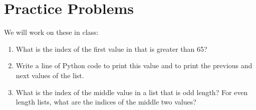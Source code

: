 \documentclass[letterpaper,10pt,english]{sphinxmanual}
\begin{document}
\section{Practice Problems}
\label{\detokenize{lecture_notes/lec08_lists1:practice-problems}}
We will work on these in class:
\begin{enumerate}
\def\theenumi{\arabic{enumi}}
\def\labelenumi{\theenumi .}
\makeatletter\def\p@enumii{\p@enumi \theenumi .}\makeatother
\item {} 
What is the index of the first value in  that is
greater than 65?

\item {} 
Write a line of Python code to print this value and to print the
previous and next values of the list.

\item {} 
What is the index of the middle value in a list that is odd length?
For even length lists, what are the indices of the middle two values?

\end{enumerate}
\end{document}
